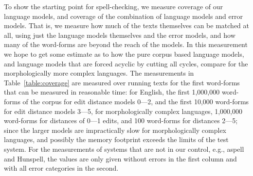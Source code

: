 \documentclass[a4paper,12pt]{article}
\begin{document}
To show the starting point for spell-checking, we measure coverage of our
language models, and coverage of the combination of language models and error
models. That is, we measure how much of the texts themselves can be matched at
all, using just the language models themselves and the error models, and how
many of the word-forms are beyond the reach of the models. In this measurement
we hope to get some estimate as to how the pure corpus based language models,
and language models that are forced acyclic by cutting all cycles, compare for
the morphologically more complex languages. The measurements in
Table~\ref{table:coverage} are measured over running texts for the first
word-forms that can be measured in reasonable time: for English, the first
1,000,000 word-forms of the corpus for edit distance models 0---2, and the
first 10,000 word-forms for edit distance models 3---5, for morphologically
complex languages, 1,000,000 word-forms for distances of 0---1 edits, and 100
word-forms for distances 2---5; since the larger models are impractically slow
for morphologically complex languages, and possibly the memory footprint
exceeds the limits of the test system. For the measurements of systems that are
not in our control, e.g., aspell and Hunspell, the values are only given
without errors in the first column and with all error categories in the second.
\end{document}
